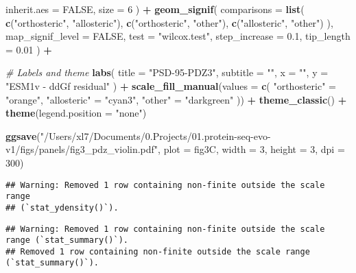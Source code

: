 \documentclass[
]{article}
\newenvironment{Shaded}{\begin{snugshade}}{\end{snugshade}}
\newcommand{\AttributeTok}[1]{\textcolor[rgb]{0.13,0.29,0.53}{#1}}
\newcommand{\CommentTok}[1]{\textcolor[rgb]{0.56,0.35,0.01}{\textit{#1}}}
\newcommand{\ConstantTok}[1]{\textcolor[rgb]{0.56,0.35,0.01}{#1}}
\newcommand{\DecValTok}[1]{\textcolor[rgb]{0.00,0.00,0.81}{#1}}
\newcommand{\FloatTok}[1]{\textcolor[rgb]{0.00,0.00,0.81}{#1}}
\newcommand{\FunctionTok}[1]{\textcolor[rgb]{0.13,0.29,0.53}{\textbf{#1}}}
\newcommand{\NormalTok}[1]{#1}
\newcommand{\OtherTok}[1]{\textcolor[rgb]{0.56,0.35,0.01}{#1}}
\newcommand{\SpecialCharTok}[1]{\textcolor[rgb]{0.81,0.36,0.00}{\textbf{#1}}}
\newcommand{\StringTok}[1]{\textcolor[rgb]{0.31,0.60,0.02}{#1}}
\begin{document}
\begin{Shaded}
\begin{Highlighting}[]
  \AttributeTok{inherit.aes =} \ConstantTok{FALSE}\NormalTok{,}
  \AttributeTok{size =} \DecValTok{6}
\NormalTok{) }\SpecialCharTok{+}
    \FunctionTok{geom\_signif}\NormalTok{(}
    \AttributeTok{comparisons =} \FunctionTok{list}\NormalTok{(}
      \FunctionTok{c}\NormalTok{(}\StringTok{"orthosteric"}\NormalTok{, }\StringTok{"allosteric"}\NormalTok{),}
      \FunctionTok{c}\NormalTok{(}\StringTok{"orthosteric"}\NormalTok{, }\StringTok{"other"}\NormalTok{),}
      \FunctionTok{c}\NormalTok{(}\StringTok{"allosteric"}\NormalTok{, }\StringTok{"other"}\NormalTok{)}
\NormalTok{    ),}
    \AttributeTok{map\_signif\_level =} \ConstantTok{FALSE}\NormalTok{,}
    \AttributeTok{test =} \StringTok{"wilcox.test"}\NormalTok{,}
    \AttributeTok{step\_increase =} \FloatTok{0.1}\NormalTok{,}
    \AttributeTok{tip\_length =} \FloatTok{0.01}
\NormalTok{  ) }\SpecialCharTok{+}
  
  \CommentTok{\# Labels and theme}
  \FunctionTok{labs}\NormalTok{(}
    \AttributeTok{title =} \StringTok{"PSD{-}95{-}PDZ3"}\NormalTok{,}
    \AttributeTok{subtitle =} \StringTok{""}\NormalTok{,}
    \AttributeTok{x =} \StringTok{""}\NormalTok{,}
    \AttributeTok{y =} \StringTok{"ESM1v {-} ddGf residual"}
\NormalTok{  ) }\SpecialCharTok{+}
  \FunctionTok{scale\_fill\_manual}\NormalTok{(}\AttributeTok{values =} \FunctionTok{c}\NormalTok{(}
    \StringTok{"orthosteric"} \OtherTok{=} \StringTok{"orange"}\NormalTok{,}
    \StringTok{"allosteric"} \OtherTok{=} \StringTok{"cyan3"}\NormalTok{,}
    \StringTok{"other"} \OtherTok{=} \StringTok{"darkgreen"}
\NormalTok{  )) }\SpecialCharTok{+}
  \FunctionTok{theme\_classic}\NormalTok{() }\SpecialCharTok{+}
  \FunctionTok{theme}\NormalTok{(}\AttributeTok{legend.position =} \StringTok{"none"}\NormalTok{)}

\FunctionTok{ggsave}\NormalTok{(}\StringTok{"/Users/xl7/Documents/0.Projects/01.protein{-}seq{-}evo{-}v1/figs/panels/fig3\_pdz\_violin.pdf"}\NormalTok{, }
       \AttributeTok{plot =}\NormalTok{ fig3C, }\AttributeTok{width =} \DecValTok{3}\NormalTok{, }\AttributeTok{height =} \DecValTok{3}\NormalTok{, }\AttributeTok{dpi =} \DecValTok{300}\NormalTok{)}
\end{Highlighting}
\end{Shaded}

\begin{verbatim}
## Warning: Removed 1 row containing non-finite outside the scale range
## (`stat_ydensity()`).
\end{verbatim}

\begin{verbatim}
## Warning: Removed 1 row containing non-finite outside the scale range (`stat_summary()`).
## Removed 1 row containing non-finite outside the scale range (`stat_summary()`).
\end{verbatim}
\end{document}
